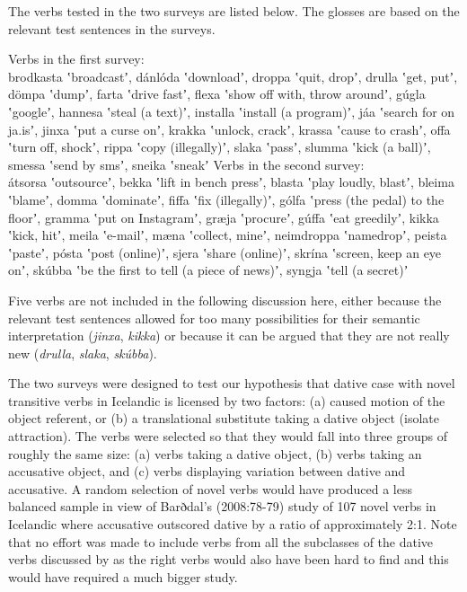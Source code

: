 \documentclass[output=paper,modfonts,nonflat]{langsci/langscibook}
\begin{document}
The verbs tested in the two surveys are listed below. The glosses are based on the relevant test sentences in the surveys. 


\ea
\ea Verbs in the first survey: \\
brodkasta ʽbroadcastʼ, dánlóda ʽdownloadʼ, droppa ʽquit, dropʼ, drulla ʽget, putʼ, dömpa ʽdumpʼ, farta ʽdrive fastʼ, flexa ʽshow off with, throw aroundʼ, gúgla ʽgoogleʼ, hannesa ʽsteal (a text)ʼ, installa ʽinstall (a program)ʼ, jáa ʽsearch for on ja.isʼ, jinxa ʽput a curse onʼ, krakka ʽunlock, crackʼ, krassa ʽcause to crashʼ, offa ʽturn off, shockʼ, rippa ʽcopy (illegally)ʼ, slaka ʽpassʼ, slumma ʽkick (a ball)ʼ, smessa ʽsend by smsʼ, sneika ʽsneakʼ
\ex Verbs in the second survey: \\
átsorsa ʽoutsourceʼ, bekka ʽlift in bench pressʼ, blasta ʽplay loudly, blastʼ, bleima ʽblameʼ, domma ʽdominateʼ, fiffa ʽfix (illegally)ʼ, gólfa ʽpress (the pedal) to the floorʼ, gramma ʽput on Instagramʼ, græja ʽprocureʼ, gúffa ʽeat greedilyʼ, kikka ʽkick, hitʼ, meila ʽe-mailʼ, mæna ʽcollect, mineʼ, neimdroppa ʽnamedropʼ, peista ʽpasteʼ, pósta ʽpost (online)ʼ, sjera ʽshare (online)ʼ, skrína ʽscreen, keep an eye onʼ, skúbba ʽbe the first to tell (a piece of news)ʼ, syngja ʽtell (a secret)ʼ\\
\z
\z

Five verbs are not included in the following discussion here, either because the relevant test sentences allowed for too many possibilities for their semantic interpretation (\textit{jinxa}, \textit{kikka}) or because it can be argued that they are not really new  (\textit{drulla}, \textit{slaka}, \textit{skúbba}). 


The two surveys were designed to test our hypothesis that dative case with novel transitive verbs in Icelandic is licensed by two factors: (a) caused motion of the object referent, or (b) a translational substitute taking a dative object (isolate attraction). The verbs were selected so that they would fall into three groups of roughly the same size: (a) verbs taking a dative object, (b) verbs taking an accusative object, and (c) verbs displaying variation between dative and accusative. A random selection of novel verbs would have produced a less balanced sample in view of Barðdal’s (2008:78-79) study of 107 novel verbs in Icelandic where accusative outscored dative by a ratio of approximately 2:1. Note that no effort was made to include verbs from all the subclasses of the dative verbs discussed by \citet{Maling2002} as the right verbs would also have been hard to find and this would have required a much bigger study.
\end{document}
